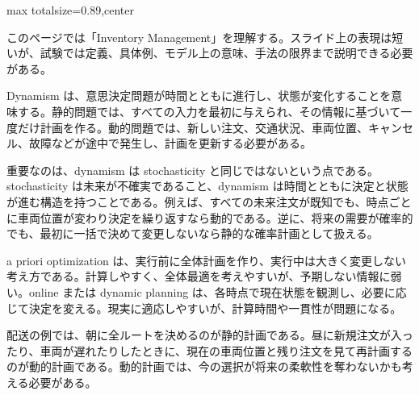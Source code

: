 \begin{minipage}[t]{0.58\textwidth}
\begin{adjustbox}{max totalsize={\textwidth}{0.89\textheight},center}
\begin{minipage}{\textwidth}\scriptsize
{}このページでは「Inventory Management」を理解する。スライド上の表現は短いが、試験では定義、具体例、モデル上の意味、手法の限界まで説明できる必要がある。\par
Dynamism は、意思決定問題が時間とともに進行し、状態が変化することを意味する。静的問題では、すべての入力を最初に与えられ、その情報に基づいて一度だけ計画を作る。動的問題では、新しい注文、交通状況、車両位置、キャンセル、故障などが途中で発生し、計画を更新する必要がある。\par
重要なのは、dynamism は stochasticity と同じではないという点である。stochasticity は未来が不確実であること、dynamism は時間とともに決定と状態が進む構造を持つことである。例えば、すべての未来注文が既知でも、時点ごとに車両位置が変わり決定を繰り返すなら動的である。逆に、将来の需要が確率的でも、最初に一括で決めて変更しないなら静的な確率計画として扱える。\par
a priori optimization は、実行前に全体計画を作り、実行中は大きく変更しない考え方である。計算しやすく、全体最適を考えやすいが、予期しない情報に弱い。online または dynamic planning は、各時点で現在状態を観測し、必要に応じて決定を変える。現実に適応しやすいが、計算時間や一貫性が問題になる。\par
配送の例では、朝に全ルートを決めるのが静的計画である。昼に新規注文が入ったり、車両が遅れたりしたときに、現在の車両位置と残り注文を見て再計画するのが動的計画である。動的計画では、今の選択が将来の柔軟性を奪わないかも考える必要がある。\par

\end{minipage}
\end{adjustbox}
\end{minipage}
